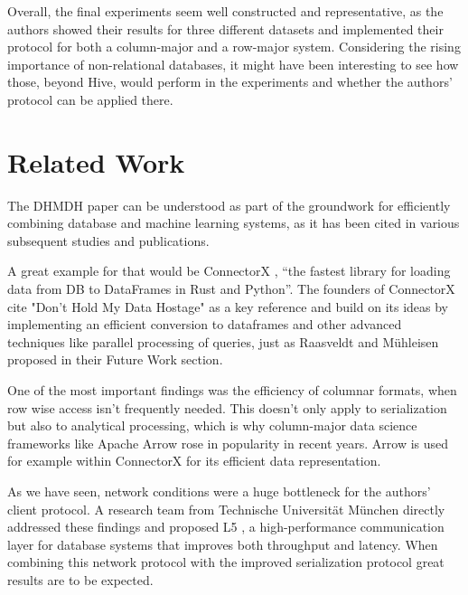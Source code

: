 \documentclass[sigconf]{acmart}
\begin{document}
Overall, the final experiments seem well constructed and representative, as the authors showed their results for three different datasets and implemented their protocol for both a column-major and a row-major system. Considering the rising importance of non-relational databases, it might have been interesting to see how those, beyond Hive, would perform in the experiments and whether the authors' protocol can be applied there.

\section{Related Work}
The DHMDH paper can be understood as part of the groundwork for efficiently combining database and machine learning systems, as it has been cited in various subsequent studies and publications.

A great example for that would be ConnectorX \cite{wang2022connectorx}, “the fastest library for loading data from DB to DataFrames in Rust and Python”. The founders of ConnectorX cite "Don't Hold My Data Hostage" as a key reference and build on its ideas by implementing an efficient conversion to dataframes and other advanced techniques like parallel processing of queries, just as Raasveldt and Mühleisen proposed in their Future Work section. 

One of the most important findings was the efficiency of columnar formats, when row wise access isn’t frequently needed. This doesn’t only apply to serialization but also to analytical processing, which is why column-major data science frameworks like Apache Arrow \cite{ApacheArrow} rose in popularity in recent years. Arrow is used for example within ConnectorX for its efficient data representation.

As we have seen, network conditions were a huge bottleneck for the authors' client protocol. A research team from Technische Universität München directly addressed these findings and proposed L5 \cite{Fent2020LowLatency}, a high-performance communication layer for database systems that improves both throughput and latency. When combining this network protocol with the improved serialization protocol great results are to be expected. 
\end{document}
